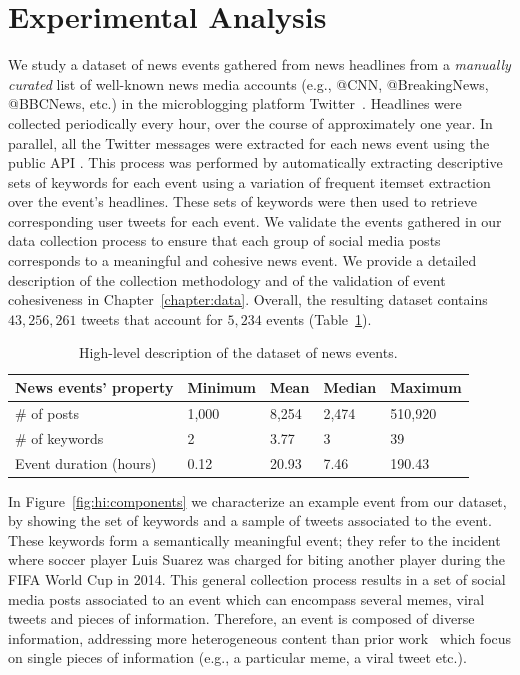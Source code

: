 
\section{Experimental Analysis}

We study a dataset of news events gathered from news headlines from a
\emph{manually curated} list of well-known news media accounts (e.g., @CNN,
@BreakingNews, @BBCNews, etc.) in the microblogging platform
Twitter~\cite{twitter}.
%
Headlines were collected periodically every hour, over the course of
approximately one year. 
%
In parallel, all the Twitter messages were extracted for each news event using
the public API \cite{twitterapi}.
%
This process was performed by automatically extracting descriptive sets of
keywords for each event using a variation of frequent itemset
extraction~\cite{Tan_Steinbach_Kumar} over the event's headlines. 
%
These sets of keywords were then used to retrieve corresponding user tweets for
each event. 
%
We validate the events gathered in our data collection process to ensure that
each group of social media posts corresponds to a meaningful and cohesive news
event. 
%
We provide a detailed description of the collection methodology and of
the validation of event cohesiveness in Chapter~\ref{chapter:data}.
%
Overall, the resulting dataset contains $43,256,261$ tweets that account for
$5,234$ events (Table~\ref{table:hi:dataset-stats}).


\begin{table}
  \centering
  \begin{tabularx}{\textwidth}{@{}p{6cm}llll@{}}
    \toprule
    \textbf{News events' property} & \textbf{Minimum} & \textbf{Mean} & \textbf{Median} & \textbf{Maximum} \\ \midrule
    \# of posts & 1,000 & 8,254 & 2,474 & 510,920 \\
    \# of keywords & 2 & 3.77 & 3 & 39 \\
    Event duration (hours) & 0.12 & 20.93 & 7.46 & 190.43 \\ \bottomrule
  \end{tabularx}
  \caption{High-level description of the dataset of news events.} 
  \label{table:hi:dataset-stats}
\end{table}



In Figure~\ref{fig:hi:components} we characterize an example event from our
dataset, by showing the set of keywords and a sample of tweets associated to the
event. 
%
These keywords form a semantically meaningful event; they refer to the incident
where soccer player Luis Suarez was charged for biting another player during the
FIFA World Cup in 2014. 
%
This general collection process results in a set of social media posts
associated to an event which can encompass several memes, viral tweets and
pieces of information. 
%
Therefore, an event is composed of diverse information, addressing more
heterogeneous content than prior
work~\cite{Castillo:2014,Szabo:2010,Lerman:2010,Tatar:2011,Pinto:2013,Ahmed:2013,suh2010want}
which focus on single pieces of information (e.g., a particular meme, a viral
tweet etc.).


